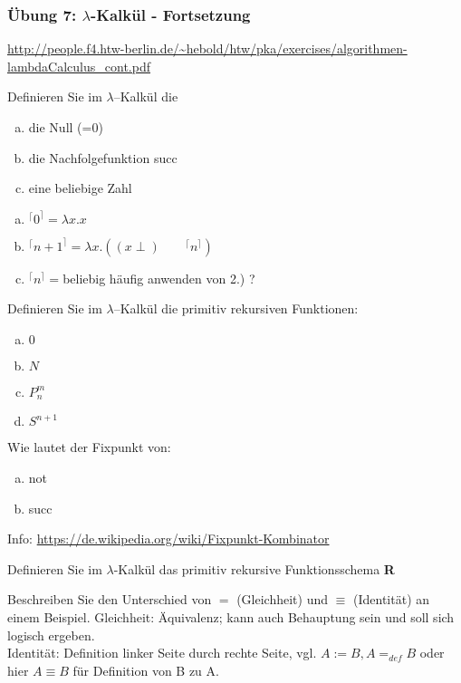\begin{card}
	\frametitle{Übung 7: $\lambda$-Kalkül - Fortsetzung}
	\url{http://people.f4.htw-berlin.de/~hebold/htw/pka/exercises/algorithmen-lambdaCalculus_cont.pdf}
\end{card}

\begin{card}
	Definieren Sie im $\lambda$–Kalkül die
	\begin{enumerate}[a)]
	\item die Null (=0)
	\item die Nachfolgefunktion succ
	\item eine beliebige Zahl
	\end{enumerate}
	\hr
	\begin{enumerate}[a)]
	\item $^\lceil 0 ^\rceil = \lambda x.x$
	\item $^\lceil n+1 ^\rceil = \lambda x.((x \perp )\qquad ^\lceil n ^\rceil)$
	\item $^\lceil n ^\rceil = $beliebig häufig anwenden von 2.) ?
	\end{enumerate}
\end{card}

\begin{card}
	Definieren Sie im $\lambda$–Kalkül die primitiv rekursiven Funktionen: 
	\begin{enumerate}[a)]
	\item $0$
	\item $N$
	\item $P^m_n$
	\item $S^{n+1}$
	\end{enumerate}
\end{card}

\begin{card}
	Wie lautet der Fixpunkt von: 
	\begin{enumerate}[a)]
	\item not
	\item succ
	\end{enumerate}
	\hr
	Info: \url{https://de.wikipedia.org/wiki/Fixpunkt-Kombinator}
\end{card}

\begin{card}
	Definieren Sie im $\lambda$-Kalkül das primitiv rekursive Funktionsschema	\textbf{R}
\end{card}

\begin{card}
	Beschreiben Sie den Unterschied von $=$ (Gleichheit) und $\equiv$ (Identität) an einem Beispiel.
	\hr
	Gleichheit: Äquivalenz; kann auch Behauptung sein und soll sich logisch ergeben.\\
	Identität: Definition linker Seite durch rechte Seite, vgl. $A := B, A=_{def} B$ oder hier $A \equiv B $ für Definition von B zu A.
\end{card}


